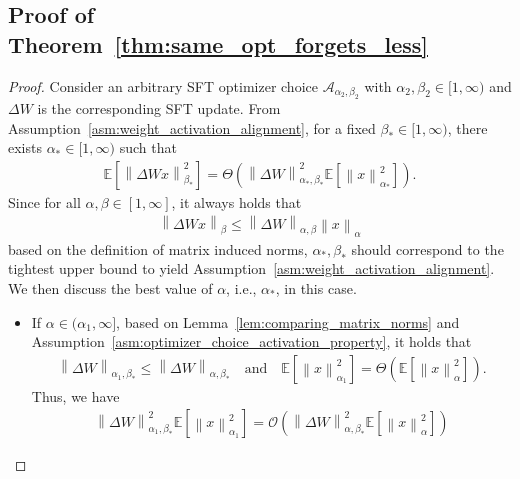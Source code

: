 \documentclass{article}
\theoremstyle{remark}
\newcommand{\Norm}[1]{\left\|#1\right\|}
\newcommand{\EE}{\mathbb{E}}
\newcommand{\cO}{\mathcal{O}}
\newcommand{\cA}{\mathcal{A}}
\begin{document}
\subsection{Proof of Theorem~\ref{thm:same_opt_forgets_less}}
\begin{proof}
    Consider an arbitrary SFT optimizer choice $\cA_{\alpha_2, \beta_2}$ with $\alpha_2,\beta_2 \in [1,\infty)$ and $\Delta W$ is the corresponding SFT update. 
    From Assumption~\ref{asm:weight_activation_alignment}, for a fixed $\beta_* \in [1,\infty)$, there exists $\alpha_* \in [1,\infty)$ such that
    \begin{align*}
        \EE\left[ \Norm{\Delta W x}_{\beta_*}^2 \right] = \Theta \left( \Norm{\Delta W}_{\alpha_*,\beta_*}^2 \EE\left[ \Norm{x}_{\alpha_*}^2 \right] \right) .
    \end{align*}
    Since for all $\alpha,\beta \in [1,\infty]$, it always holds that
    \begin{align*}
        \Norm{\Delta W x}_{\beta} \le \Norm{\Delta W}_{\alpha,\beta} \Norm{x}_\alpha 
    \end{align*}
    based on the definition of matrix induced norms, $\alpha_*,\beta_*$ should correspond to the tightest upper bound to yield Assumption~\ref{asm:weight_activation_alignment}.
    We then discuss the best value of $\alpha$, i.e., $\alpha_*$, in this case. 
    \begin{itemize}
        \item If $\alpha \in (\alpha_1,\infty]$, based on Lemma~\ref{lem:comparing_matrix_norms} and Assumption~\ref{asm:optimizer_choice_activation_property}, it holds that
        \begin{align*}
            \Norm{\Delta W}_{\alpha_1,\beta_*} \le \Norm{\Delta W}_{\alpha,\beta_*} \quad \mathrm{and} \quad \EE\left[ \Norm{x}_{\alpha_1}^2 \right] = \Theta\left( \EE\left[ \Norm{x}_{\alpha}^2 \right] \right).
        \end{align*}
        Thus, we have
        \begin{align*}
            \Norm{\Delta W}_{\alpha_1,\beta_*}^2 \EE\left[ \Norm{x}_{\alpha_1}^2 \right] = \cO\left( \Norm{\Delta W}_{\alpha,\beta_*}^2 \EE\left[ \Norm{x}_{\alpha}^2 \right] \right)
        \end{align*}
        

\end{itemize}
\end{proof}
\end{document}
